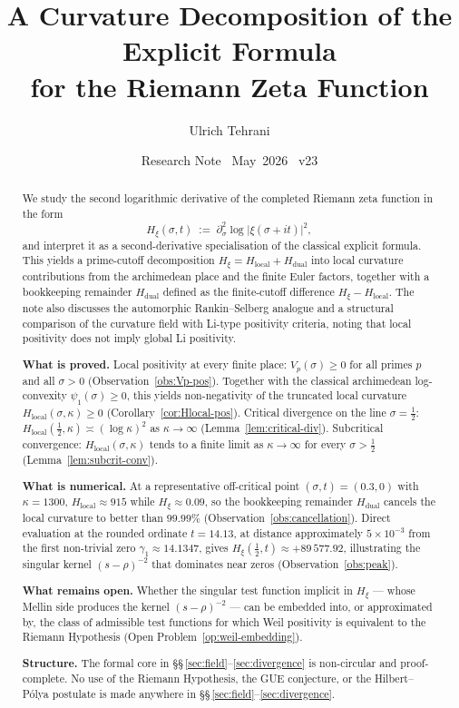 \documentclass[11pt]{article}
\title{\vspace{-1.5em}\bfseries
A Curvature Decomposition of the Explicit Formula\\[0.4em]
\large for the Riemann Zeta Function}
\author{Ulrich Tehrani}
\date{Research Note \textperiodcentered\ May~2026
      \textperiodcentered\ v23}
\newcommand{\Hxi}{H_{\xi}}
\newcommand{\Hlocal}{H_{\mathrm{local}}}
\newcommand{\Hdual}{H_{\mathrm{dual}}}
\begin{document}
\maketitle

\begin{abstract}
We study the second logarithmic derivative of the completed
Riemann zeta function in the form
\[
\Hxi(\sigma,t)\;:=\;\partial_{\sigma}^{2}\log
\lvert\xi(\sigma+it)\rvert^{2},
\]
and interpret it as a second-derivative specialisation of the
classical explicit formula. This yields a prime-cutoff
decomposition $\Hxi=\Hlocal+\Hdual$ into local curvature
contributions from the archimedean place and the finite Euler
factors, together with a bookkeeping remainder $\Hdual$
defined as the finite-cutoff difference $\Hxi-\Hlocal$.
The note also discusses the automorphic Rankin--Selberg
analogue and a structural comparison of the curvature field
with Li-type positivity criteria, noting that local positivity
does not imply global Li positivity.

\textbf{What is proved.}
Local positivity at every finite place: $V_p(\sigma)\ge 0$ for
all primes $p$ and all $\sigma>0$ (Observation~\ref{obs:Vp-pos}).
Together with the classical archimedean log-convexity
$\psi_1(\sigma)\ge 0$, this yields non-negativity of the
truncated local curvature $\Hlocal(\sigma,\kappa)\ge 0$
(Corollary~\ref{cor:Hlocal-pos}).
Critical divergence on the line $\sigma=\tfrac12$:
$\Hlocal(\tfrac12,\kappa)\asymp(\log\kappa)^{2}$ as
$\kappa\to\infty$ (Lemma~\ref{lem:critical-div}).
Subcritical convergence: $\Hlocal(\sigma,\kappa)$ tends to a
finite limit as $\kappa\to\infty$ for every $\sigma>\tfrac12$
(Lemma~\ref{lem:subcrit-conv}).

\textbf{What is numerical.}
At a representative off-critical point $(\sigma,t)=(0.3,0)$
with $\kappa=1300$, $\Hlocal\approx 915$ while
$\Hxi\approx 0.09$, so the bookkeeping remainder $\Hdual$
cancels the local curvature to better than $99.99\%$
(Observation~\ref{obs:cancellation}).
Direct evaluation at the rounded ordinate $t=14.13$, at
distance approximately $5\times 10^{-3}$ from the first
non-trivial zero $\gamma_1\approx 14.1347$, gives
$\Hxi(\tfrac12,t)\approx +89\,577.92$, illustrating the
singular kernel $(s-\rho)^{-2}$ that dominates near zeros
(Observation~\ref{obs:peak}).

\textbf{What remains open.}
Whether the singular test function implicit in $\Hxi$ ---
whose Mellin side produces the kernel $(s-\rho)^{-2}$ --- can
be embedded into, or approximated by, the class of admissible
test functions for which Weil positivity is equivalent to the
Riemann Hypothesis (Open Problem~\ref{op:weil-embedding}).

\textbf{Structure.}
The formal core in
\S\S\,\ref{sec:field}--\ref{sec:divergence} is non-circular
and proof-complete.
No use of the Riemann Hypothesis, the GUE conjecture, or the
Hilbert--P\'olya postulate is made anywhere in
\S\S\,\ref{sec:field}--\ref{sec:divergence}.
\end{abstract}
\end{document}
